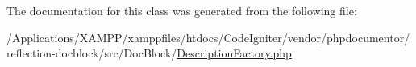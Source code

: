 The documentation for this class was generated from the following file\+:\begin{DoxyCompactItemize}
\item 
/\+Applications/\+X\+A\+M\+P\+P/xamppfiles/htdocs/\+Code\+Igniter/vendor/phpdocumentor/reflection-\/docblock/src/\+Doc\+Block/\mbox{\hyperlink{_description_factory_8php}{Description\+Factory.\+php}}\end{DoxyCompactItemize}
